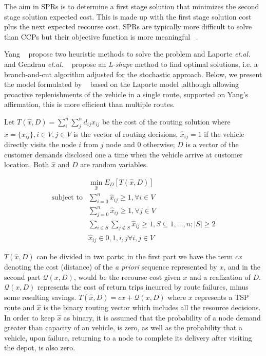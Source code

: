 The aim in SPRs is to determine a first stage solution that minimizes the second stage solution expected cost. This is made up with the first stage solution cost plus the next expected recourse cost. SPRs are typically more difficult to solve than CCPs but their objective function is more meaningful ~\cite{gendreau_stochastic_1996}.


Yang ~\cite{yang_stochastic_2000} propose two heuristic methods to solve the problem and Laporte \textit{et.al.}  ~\cite{laporte_integer_2002} and Gendrau \textit{et.al.} ~\cite{gendreau_exact_1995} propose an \textit{L-shape} method to find optimal solutions, i.e. a branch-and-cut algorithm adjusted for the stochastic approach. Below, we present the model formulated by ~\cite{Dror_2005} based on the Laporte model ,although allowing proactive replenishments of the vehicle in a single route, supported on Yang's affirmation, this is more efficient than multiple routes.

Let $T(\hat{x},D) =\sum_i^n\sum_j^nd_{ij}x_{ij}$ be the cost of the routing solution where $\hat{x}=\{x_{ij}\},i\in V,j\in V$ is the vector of routing decisions, $\hat{x}_{ij} =1$ if the vehicle directly visits the node $i$ from $j$ node and $0$ otherwise; $D$ is a vector of the customer demands disclosed one a time when the vehicle arrive at customer location. Both $\hat{x}$ and $D$ are random variables.

\begin{align}\label{eq:SPR}
  & \min\limits_{\hat{x}} E_D[T(\hat{x},D)]\\ 
 \text{subject to} & \sum_{i=0}^n\hat{x}_{ij} \geq 1, \forall i \in V\\
  & \sum_{j=0}^n\hat{x}_{ij} \geq 1, \forall j \in V\\
  & \sum_{i\in S}\sum_{j\notin S}\hat{x}_{ij} \geq 1, S\subseteq {1,\ldots,n};|S|\geq2\\
  & \hat{x}_{ij} \in {0,1}, i,j \forall i,j \in V
\end{align}

$T(\hat{x},D)$ can be divided in two parts; in the first part we have the term $cx$ denoting the cost (distance) of the \textit{a priori} sequence represented by $x$, and in the second part $\mathcal{Q}(x,D)$, would be the recourse cost given $x$ and a realization of $D$. $\mathcal{Q}(x,D)$ represents the cost of return trips incurred by route failures, minus some resulting savings.
$T(\hat{x},D) = cx+\mathcal{Q}(x,D)$ where $x$ represents a TSP route and $\hat{x}$ is the binary routing vector which includes all the resource decisions. In order to keep $\hat{x}$ as binary, it is assumed that the probability of a node demand greater than capacity of an vehicle, is zero, as well as the probability that a vehicle, upon failure, returning to a node to complete its delivery after visiting the depot, is also zero.

